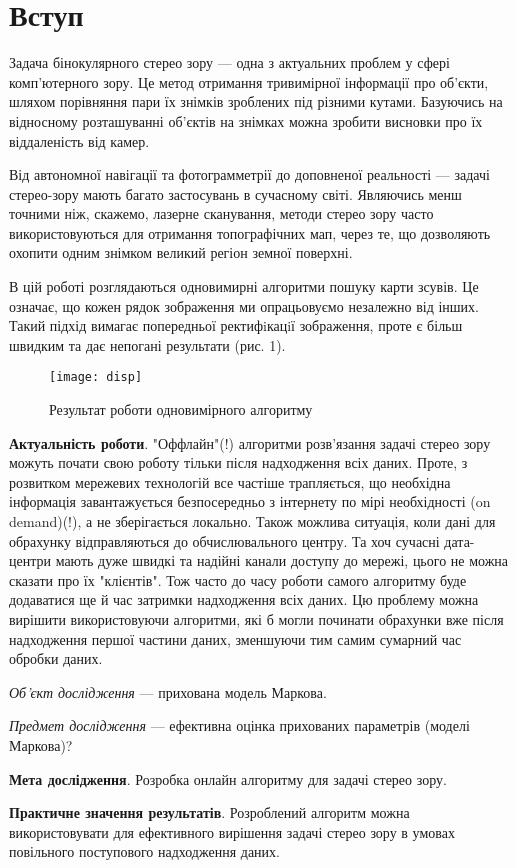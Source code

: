 \chapter*{Вступ}

	Задача бінокулярного стерео зору --- одна з актуальних проблем у сфері комп'ютерного зору. Це метод отримання тривимірної інформації про об'єкти, шляхом порівняння пари їх знімків зроблених під різними кутами. Базуючись на відносному розташуванні об'єктів на знімках можна зробити висновки про їх віддаленість від камер. 
	
	Від автономної навігації та фотограмметрії до доповненої реальності --– задачі стерео-зору мають багато застосувань в сучасному світі. Являючись менш точними ніж, скажемо, лазерне сканування, методи стерео зору часто використовуються для отримання топографічних мап, через те, що дозволяють охопити одним знімком великий регіон земної поверхні. 

	В цій роботі розглядаються одновимирні алгоритми пошуку карти зсувів. Це означає, що кожен рядок зображення ми опрацьовуємо незалежно від інших. Такий підхід вимагає попередньої ректифiкацiї зображення, проте є більш швидким та дає непогані результати (рис. 1).
\begin{figure}
	\centering
	\texttt{[image: disp]}
	\caption{Результат роботи одновимірного алгоритму}
	\label{results}
\end{figure}
	
\textbf{Актуальність роботи}. "Оффлайн"(!) алгоритми розв'язання задачі стерео зору можуть почати свою роботу тільки після надходження всіх даних. Проте, з розвитком мережевих технологій все частіше трапляється, що необхідна інформація  завантажується безпосередньо з інтернету по мірі необхідності (on demand)(!), а не зберігається локально. Також можлива ситуація, коли дані для обрахунку відправляються до обчислювального центру. Та хоч сучасні дата-центри мають дуже швидкі та надійні канали доступу до мережі, цього не можна сказати про їх "клієнтів". Тож часто до часу роботи самого алгоритму буде додаватися ще й час затримки надходження всіх даних. Цю проблему можна вирішити використовуючи алгоритми, які б могли починати обрахунки вже після надходження першої частини даних, зменшуючи тим самим сумарний час обробки даних.

\textit{Об'єкт дослідження} --- прихована модель Маркова.

\textit{Предмет дослідження} --- ефективна оцінка прихованих параметрів (моделі Маркова)?

\textbf{Мета дослідження}. Розробка онлайн алгоритму для задачі стерео зору.

\textbf{Практичне значення результатів}. Розроблений алгоритм можна використовувати для ефективного вирішення задачі стерео зору в умовах повільного поступового надходження даних.
	
